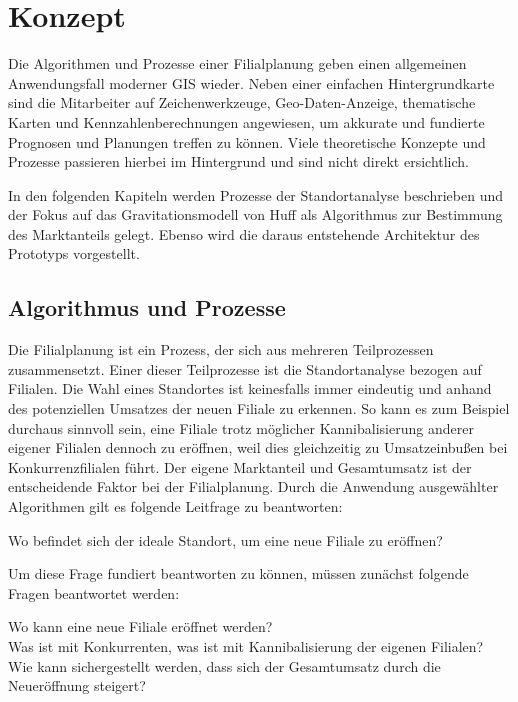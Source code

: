 \chapter{Konzept}
\label{ch:concept}
Die Algorithmen und Prozesse einer Filialplanung geben einen allgemeinen Anwendungsfall moderner GIS wieder. 
Neben einer einfachen Hintergrundkarte sind die Mitarbeiter auf Zeichenwerkzeuge, Geo-Daten-Anzeige, thematische Karten und Kennzahlenberechnungen angewiesen, um akkurate und fundierte Prognosen und Planungen treffen zu können.
Viele theoretische Konzepte und Prozesse passieren hierbei im Hintergrund und sind nicht direkt ersichtlich.

In den folgenden Kapiteln werden Prozesse der Standortanalyse beschrieben und der Fokus auf das Gravitationsmodell von Huff als Algorithmus zur Bestimmung des Marktanteils gelegt.
Ebenso wird die daraus entstehende Architektur des Prototyps vorgestellt.

\section{Algorithmus und Prozesse}
Die Filialplanung ist ein Prozess, der sich aus mehreren Teilprozessen zusammensetzt. 
Einer dieser Teilprozesse ist die Standortanalyse bezogen auf Filialen.
Die Wahl eines Standortes ist keinesfalls immer eindeutig und anhand des potenziellen Umsatzes der neuen Filiale zu erkennen.
So kann es zum Beispiel durchaus sinnvoll sein, eine Filiale trotz möglicher Kannibalisierung anderer eigener Filialen dennoch zu eröffnen, weil dies gleichzeitig zu Umsatzeinbußen bei Konkurrenzfilialen führt. 
Der eigene Marktanteil und Gesamtumsatz ist der entscheidende Faktor bei der Filialplanung.
Durch die Anwendung ausgewählter Algorithmen gilt es folgende Leitfrage zu beantworten:

Wo befindet sich der ideale Standort, um eine neue Filiale zu eröffnen?

Um diese Frage fundiert beantworten zu können, müssen zunächst folgende Fragen beantwortet werden:

Wo kann eine neue Filiale eröffnet werden?\\
Was ist mit Konkurrenten, was ist mit Kannibalisierung der eigenen Filialen?\\
Wie kann sichergestellt werden, dass sich der Gesamtumsatz durch die Neueröffnung steigert?

